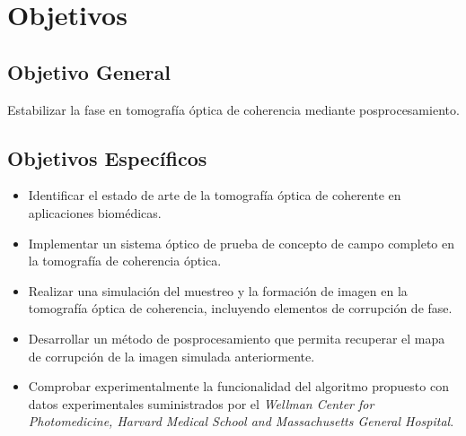 \section{Objetivos}
\label{sec:objetivos}
\subsection{Objetivo General}
Estabilizar la fase en tomografía óptica de coherencia mediante posprocesamiento.

\subsection{Objetivos Específicos}

\begin{itemize}
	\item Identificar el estado de arte de la tomografía óptica de coherente en aplicaciones biomédicas.
	\item Implementar un sistema óptico de prueba de concepto de campo completo en la tomografía de coherencia óptica.
	\item Realizar una simulación del muestreo y la formación de imagen en la tomografía óptica de coherencia, incluyendo elementos de corrupción de fase.
	\item Desarrollar un método de posprocesamiento que permita recuperar el mapa de corrupción de la imagen simulada anteriormente.
	\item Comprobar experimentalmente la funcionalidad del algoritmo propuesto con datos experimentales suministrados por el \emph{Wellman Center for Photomedicine, Harvard Medical School and Massachusetts General Hospital}.
	
\end{itemize}


